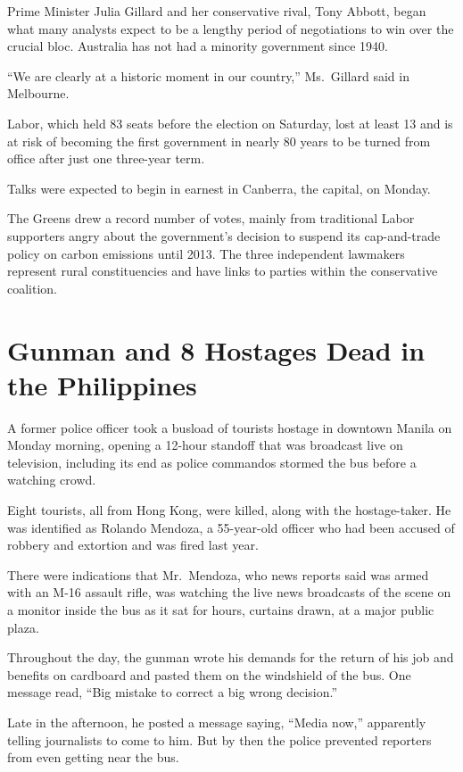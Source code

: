 ﻿\documentclass[12pt]{article}
\begin{document}
Prime Minister Julia Gillard and her conservative rival, Tony Abbott, began what many analysts
expect to be a lengthy period of negotiations to win over the crucial bloc. Australia has not had a
minority government since 1940.

``We are clearly at a historic moment in our country,'' Ms.~Gillard said in Melbourne.

Labor, which held 83 seats before the election on Saturday, lost at least 13 and is at risk of
becoming the first government in nearly 80 years to be turned from office after just one three-year
term.

Talks were expected to begin in earnest in Canberra, the capital, on Monday.

The Greens drew a record number of votes, mainly from traditional Labor supporters angry about the
government's decision to suspend its cap-and-trade policy on carbon emissions until 2013. The three
independent lawmakers represent rural constituencies and have links to parties within the
conservative coalition.

\pagebreak
\section{Gunman and 8 Hostages Dead in the Philippines}

\lettrine{A}{} former police officer took a busload of tourists hostage in
downtown Manila on Monday morning, opening a 12-hour standoff that was broadcast live on television,
including its end as police commandos stormed the bus before a watching crowd.

Eight tourists, all from Hong Kong, were killed, along with the hostage-taker. He was identified as
Rolando Mendoza, a 55-year-old officer who had been accused of robbery and extortion and was fired
last year.

There were indications that Mr.~Mendoza, who news reports said was armed with an M-16 assault rifle,
was watching the live news broadcasts of the scene on a monitor inside the bus as it sat for hours,
curtains drawn, at a major public plaza.

Throughout the day, the gunman wrote his demands for the return of his job and benefits on cardboard
and pasted them on the windshield of the bus. One message read, ``Big mistake to correct a big wrong
decision.''

Late in the afternoon, he posted a message saying, ``Media now,'' apparently telling journalists to
come to him. But by then the police prevented reporters from even getting near the bus.
\end{document}
